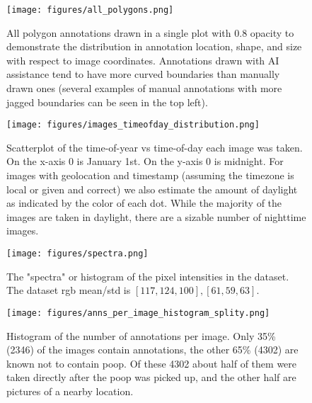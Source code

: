 \documentclass[10pt,twocolumn,letterpaper]{article}
\begin{document}

\begin{figure}[ht]
\centering
\texttt{[image: figures/all\_polygons.png]}
\caption[]{
    All polygon annotations drawn in a single plot with 0.8 opacity to
    demonstrate the distribution in annotation location, shape, and size with
    respect to image coordinates. Annotations drawn with AI
    assistance tend to have more curved boundaries than manually drawn ones
    (several examples of manual annotations with more jagged boundaries can be
    seen in the top left).
}
\label{fig:AllPolygons}
\end{figure}

\begin{figure}[ht]
\centering
\texttt{[image: figures/images\_timeofday\_distribution.png]}
\caption[]{
    Scatterplot of the time-of-year vs time-of-day each image was taken. On the
    x-axis 0 is January 1st. On the y-axis 0 is midnight. For images with
    geolocation and timestamp (assuming the timezone is local or given and
    correct) we also estimate the amount of daylight as indicated by the color
    of each dot. While the majority of the images are taken in daylight, there
    are a sizable number of nighttime images.
}
\label{fig:TimeOfDayDistribution}
\end{figure}

\begin{figure}[ht]
\centering
\texttt{[image: figures/spectra.png]}
\caption[]{
    The "spectra" or histogram of the pixel intensities in the dataset. 
    The dataset rgb  mean/std is $[117, 124, 100], [61, 59, 63]$.
}
\label{fig:spectra}
\end{figure}


\begin{figure}[ht]
\centering
\texttt{[image: figures/anns\_per\_image\_histogram\_splity.png]}
\caption[]{
    Histogram of the number of annotations per image. 
    Only 35\% (2346) of the images contain annotations, the other 65\% (4302)
    are known not to contain poop. Of these 4302 about half of them were taken
    directly after the poop was picked up, and the other half are pictures of a
    nearby location.
}
\label{fig:AnnotsPerImage}
\end{figure}
\end{document}
